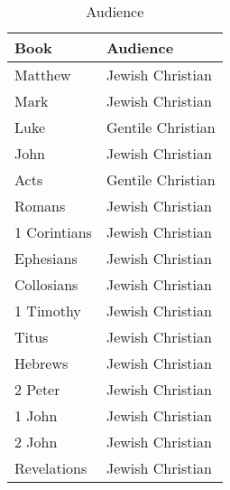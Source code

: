\documentclass{article}
\begin{document}
\begin{table}
    \centering
    \begin{tabular}{ll}
    \toprule
        Book & Audience \\
    \midrule
        Matthew & Jewish Christian \\
        Mark & Jewish Christian \\
        Luke & Gentile Christian \\
        John & Jewish Christian \\
        Acts & Gentile Christian \\
        Romans & Jewish Christian \\
        1 Corintians & Jewish Christian \\
        Ephesians & Jewish Christian \\
        Collosians & Jewish Christian \\
        1 Timothy & Jewish Christian \\
        Titus & Jewish Christian \\
        Hebrews & Jewish Christian \\
        2 Peter & Jewish Christian \\
        1 John & Jewish Christian \\
        2 John & Jewish Christian \\
        Revelations & Jewish Christian \\
    \bottomrule
    \end{tabular}
    \caption{Audience}
    \label{audience}
\end{table}
\end{document}
